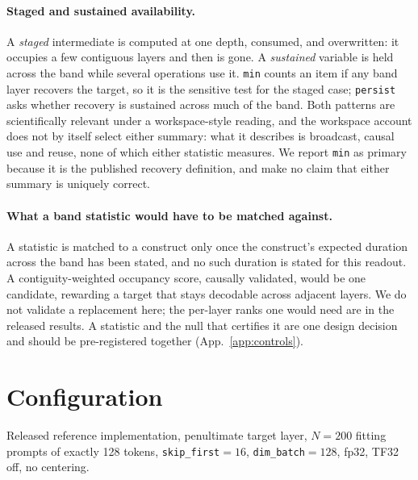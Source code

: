 \documentclass{article}
\newcommand{\mn}{\texttt{min}}
\newcommand{\pe}{\texttt{persist}}
\begin{document}
\paragraph{Staged and sustained availability.} A \emph{staged} intermediate is computed at one
depth, consumed, and overwritten: it occupies a few contiguous layers and then is gone. A
\emph{sustained} variable is held across the band while several operations use it. \mn{} counts an item if any band layer recovers the target, so it is the sensitive test for the
staged case; \pe{} asks
whether recovery is sustained across much of the band. Both patterns are scientifically relevant
under a workspace-style reading, and the workspace account does not by itself select either
summary: what it describes is broadcast, causal use and reuse, none of which either statistic
measures. We report \mn{} as primary because it is the published recovery definition, and make no
claim that either summary is uniquely correct.

\paragraph{What a band statistic would have to be matched against.} A statistic is matched to a
construct only once the construct's expected duration across the band has been stated, and no such
duration is stated for this readout. A contiguity-weighted occupancy score, causally validated,
would be one candidate, rewarding a target that stays decodable across adjacent layers. We do not
validate a replacement here; the per-layer ranks one would need are in the released results. A statistic and the null that certifies it are one design decision and should be pre-registered
together (App.~\ref{app:controls}).

\section{Configuration}
\label{app:config}

Released reference implementation, penultimate target layer, $N{=}200$ fitting prompts of exactly
128 tokens, \texttt{skip\_first}${=}16$, \texttt{dim\_batch}${=}128$, fp32, TF32 off, no centering.
\end{document}
